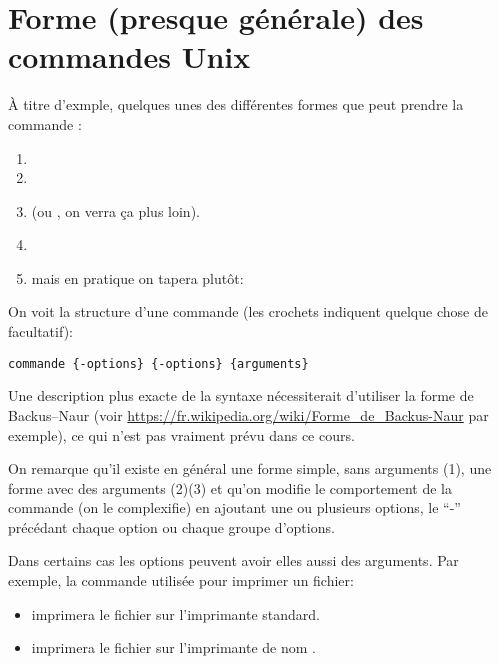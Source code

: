 \section{Forme (presque générale) des commandes Unix}
  \`A titre d'exmple, quelques unes des  différentes formes que
 peut prendre la commande :

  \begin{enumerate}
  \item {}
  \item {}

  \item   {}

    (ou , on
    verra ça  plus loin).%

  \item {}
  \item {}

    mais en pratique on tapera plutôt:

    
  \end{enumerate}

  On voit la structure d'une commande (les crochets \ttt{\{  \}}
  indiquent quelque chose de facultatif): 

  \begin{center}
    \texttt{commande \{-options\} \{-options\} \{arguments\}}
  \end{center}

  Une description plus exacte de la syntaxe nécessiterait d'utiliser
  la forme de Backus--Naur (voir
  \url{https://fr.wikipedia.org/wiki/Forme_de_Backus-Naur} par
  exemple), ce qui n'est pas vraiment prévu dans ce cours.

  On remarque qu'il existe en général une forme simple, sans
  arguments (1), une forme avec des arguments (2)(3) et qu'on modifie le
  comportement de la commande (on le complexifie) en ajoutant une ou
  plusieurs options, le ``-'' précédant chaque option ou chaque groupe
  d'options.

  Dans certains cas les options peuvent avoir elles aussi des
  arguments. Par exemple, la commande utilisée pour imprimer un fichier:

  \begin{itemize}
    \item {}

      imprimera le fichier sur l'imprimante standard.

    \item {}

      imprimera le fichier sur l'imprimante de nom .
  \end{itemize}
  
  

  
